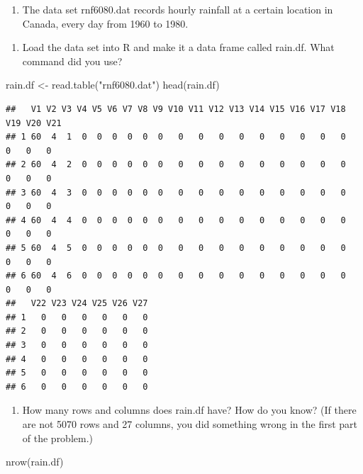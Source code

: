 \documentclass[
]{article}
\newenvironment{Shaded}{\begin{snugshade}}{\end{snugshade}}
\newcommand{\FunctionTok}[1]{\textcolor[rgb]{0.00,0.00,0.00}{#1}}
\newcommand{\NormalTok}[1]{#1}
\newcommand{\OtherTok}[1]{\textcolor[rgb]{0.56,0.35,0.01}{#1}}
\newcommand{\StringTok}[1]{\textcolor[rgb]{0.31,0.60,0.02}{#1}}
\providecommand{\tightlist}{%
  \setlength{\itemsep}{0pt}\setlength{\parskip}{0pt}}
\begin{document}
\begin{enumerate}
\def\labelenumi{\arabic{enumi}.}
\tightlist
\item
  The data set rnf6080.dat records hourly rainfall at a certain location
  in Canada, every day from 1960 to 1980.
\end{enumerate}

\begin{enumerate}
\def\labelenumi{\alph{enumi}.}
\tightlist
\item
  Load the data set into R and make it a data frame called rain.df. What
  command did you use?
\end{enumerate}

\begin{Shaded}
\begin{Highlighting}[]
\NormalTok{rain.df }\OtherTok{\textless{}{-}} \FunctionTok{read.table}\NormalTok{(}\StringTok{"rnf6080.dat"}\NormalTok{)}
\FunctionTok{head}\NormalTok{(rain.df)}
\end{Highlighting}
\end{Shaded}

\begin{verbatim}
##   V1 V2 V3 V4 V5 V6 V7 V8 V9 V10 V11 V12 V13 V14 V15 V16 V17 V18 V19 V20 V21
## 1 60  4  1  0  0  0  0  0  0   0   0   0   0   0   0   0   0   0   0   0   0
## 2 60  4  2  0  0  0  0  0  0   0   0   0   0   0   0   0   0   0   0   0   0
## 3 60  4  3  0  0  0  0  0  0   0   0   0   0   0   0   0   0   0   0   0   0
## 4 60  4  4  0  0  0  0  0  0   0   0   0   0   0   0   0   0   0   0   0   0
## 5 60  4  5  0  0  0  0  0  0   0   0   0   0   0   0   0   0   0   0   0   0
## 6 60  4  6  0  0  0  0  0  0   0   0   0   0   0   0   0   0   0   0   0   0
##   V22 V23 V24 V25 V26 V27
## 1   0   0   0   0   0   0
## 2   0   0   0   0   0   0
## 3   0   0   0   0   0   0
## 4   0   0   0   0   0   0
## 5   0   0   0   0   0   0
## 6   0   0   0   0   0   0
\end{verbatim}

\begin{enumerate}
\def\labelenumi{\alph{enumi}.}
\setcounter{enumi}{1}
\tightlist
\item
  How many rows and columns does rain.df have? How do you know? (If
  there are not 5070 rows and 27 columns, you did something wrong in the
  first part of the problem.)
\end{enumerate}

\begin{Shaded}
\begin{Highlighting}[]
\FunctionTok{nrow}\NormalTok{(rain.df)}
\end{Highlighting}
\end{Shaded}
\end{document}
